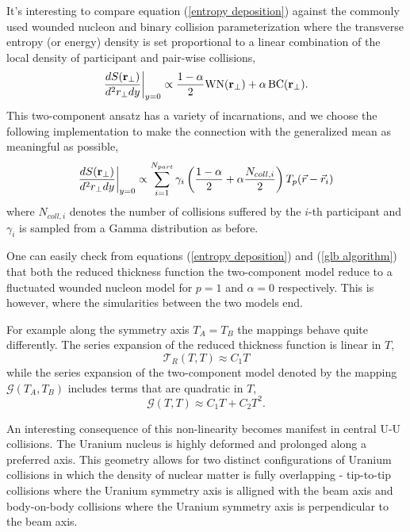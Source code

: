 \documentclass[aps,prl,reprint,amsmath,nofootinbib]{revtex4-1}
\begin{document}
It's interesting to compare equation (\ref{entropy deposition}) against the commonly used wounded nucleon and binary collision parameterization where the 
transverse entropy (or energy) density is set proportional to a linear combination of the local density of participant and pair-wise collisions,
\begin{equation}
 \frac{dS({\bf r}_\perp)}{d^2r_\perp dy} \biggr \rvert_{y=0}  \propto \frac{1-\alpha}{2}\mbox{WN}({\bf r_\perp}) + \alpha\, \mbox{BC}({\bf r_\perp}). 
\end{equation}
This two-component ansatz has a variety of incarnations, and we choose the following implementation to make the connection with the generalized mean as meaningful 
as possible,
\begin{equation}
 \label{glb algorithm}
 \frac{dS({\bf r}_\perp)}{d^2r_\perp dy} \biggr \rvert_{y=0}  \propto \sum\limits_{i=1}^{N_{part}} \gamma_i \left(\frac{1-\alpha}{2} + \alpha \frac{N_{coll,i}}{2} \right ) T_p(\vec{r}-\vec{r}_i)
\end{equation}
where $N_{coll,i}$ denotes the number of collisions suffered by the $i$-th participant and $\gamma_i$ is sampled from a Gamma distribution as before.

One can easily check from equations (\ref{entropy deposition}) and (\ref{glb algorithm}) that both the reduced thickness function the two-component model reduce to a 
fluctuated wounded nucleon model for $p=1$ and $\alpha=0$ respectively. This is however, where the simularities between the two models end.

For example along the symmetry axis $T_A=T_B$ the mappings behave quite differently. The series expansion of the reduced thickness function is linear in $T$,
\begin{equation}
 \mathcal{T}_R(T,T) \approx C_1 T
\end{equation}
while the series expansion of the two-component model denoted by the mapping $\mathcal{G}(T_A,T_B)$ includes terms that are quadratic in $T$,
\begin{equation}
 \mathcal{G}(T,T) \approx C_1 T + C_2 T^2.
\end{equation}

An interesting consequence of this non-linearity becomes manifest in central U-U collisions. The Uranium nucleus is highly deformed and prolonged along a preferred 
axis. This geometry allows for two distinct configurations of Uranium collisions in which the density of nuclear matter is fully overlapping - tip-to-tip collisions 
where the Uranium symmetry axis is alligned with the beam axis and body-on-body collisions where the Uranium symmetry axis is perpendicular to the beam axis. 
\end{document}
